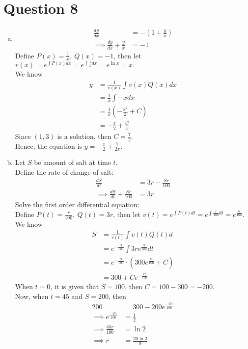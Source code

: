 \documentclass[11pt]{article}
\begin{document}
\section*{Question 8}
\begin{enumerate}[(a)]
    \item 
    \begin{align*}
        \frac{dy}{dx}&=-(1+\frac{y}{x})\\
        \implies \frac{dy}{dx}+\frac{y}{x}&=-1 
    \end{align*}
    Define $\displaystyle P(x)= \frac{1}{x}, \ Q(x) = -1$, then let $\displaystyle v(x)= e^{\int {P(x)dx}}= e^{\int \frac{1}{x}dx}= e^{\ln{x}} = x.$\\
    We know 
    \begin{align*}
        y&=\frac{1}{v(x)}\int v(x)Q(x)dx\\
        &= \frac{1}{x} {\int{-x}dx}\\
        &= \frac{1}{x} ({-\frac{x^2}{2}}+C)\\
        &= -\frac{x}{2}+\frac{C}{x}
    \end{align*}
    Since $(1,3)$ is a solution, then $\displaystyle C=\frac{7}{2}.$\\
    
    Hence, the equation is $\displaystyle y=-\frac{x}{2}+\frac{7}{2x}.$
    \item 
    Let $S$ be amount of salt at time $t$.\\
    Define the rate of change of salt: 
    \begin{align*}
        \frac{dS}{dt}&= 3r - \frac{Sr}{100}\\
        \implies \frac{dS}{dt}+\frac{Sr}{100}&=3r
    \end{align*}
    Solve the first order differential equation: \\
    Define $\displaystyle P(t) = \frac{r}{100}, \ Q(t)=3r$, then let $\displaystyle v(t)=e^{\int{P(t)dt}}=e^{\int\frac{r}{100}dt}=e^{\frac{rt}{100}}.$\\
    We know 
    \begin{align*}
        S &= \frac{1}{v(t)}\int v(t)Q(t)d\\
        &= e^{-\frac{rt}{100}} \int{3re^{\frac{rt}{100}}dt}\\
        &= e^{-\frac{rt}{100}}\cdot (300e^{\frac{rt}{100}}+C)\\
        &= 300 + C e^{-\frac{rt}{100}}
    \end{align*}
    When $t=0$, it is given that $S=100$, then $C=100-300=-200.$\\
    Now, when $t=45$ and $S=200$, then 
    \begin{align*}
        200 &= 300-200e^\frac{-45r}{100}\\
        \implies e^{\frac{-45r}{100}}&=\frac{1}{2}\\
        \implies \frac{45r}{100}&=\ln{2}\\
        \implies r &= \frac{20\ln{2}}{9}
    \end{align*}
\end{enumerate}
\end{document}

